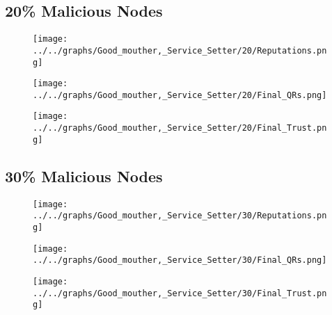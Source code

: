 \begin{minipage}[t]{0.49\columnwidth}
\subsection*{20\% Malicious Nodes}
    \begin{figure}[H]
        \centering
        \texttt{[image: ../../graphs/Good\_mouther,\_Service\_Setter/20/Reputations.png]}
    \end{figure}
    \begin{figure}[H]
        \centering
        \texttt{[image: ../../graphs/Good\_mouther,\_Service\_Setter/20/Final\_QRs.png]}
    \end{figure}
\end{minipage}
\begin{minipage}[t]{0.49\columnwidth}
    \begin{figure}[H]
        \centering
        \texttt{[image: ../../graphs/Good\_mouther,\_Service\_Setter/20/Final\_Trust.png]}
    \end{figure}
\end{minipage}

\begin{minipage}[t]{0.49\columnwidth}
\subsection*{30\% Malicious Nodes}
    \begin{figure}[H]
        \centering
        \texttt{[image: ../../graphs/Good\_mouther,\_Service\_Setter/30/Reputations.png]}
    \end{figure}
    \begin{figure}[H]
        \centering
        \texttt{[image: ../../graphs/Good\_mouther,\_Service\_Setter/30/Final\_QRs.png]}
    \end{figure}
\end{minipage}
\begin{minipage}[t]{0.49\columnwidth}
    \begin{figure}[H]
        \centering
        \texttt{[image: ../../graphs/Good\_mouther,\_Service\_Setter/30/Final\_Trust.png]}
    \end{figure}
\end{minipage}

